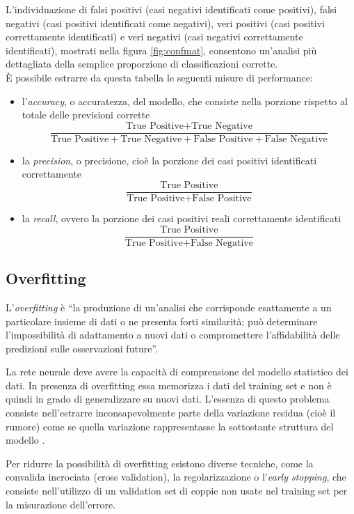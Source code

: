 L'individuazione di falsi positivi (casi negativi identificati come positivi), falsi negativi (casi positivi identificati come negativi), veri positivi (casi positivi correttamente identificati) e veri negativi (casi negativi correttamente identificati), mostrati nella figura \ref{fig:confmat}, consentono  un'analisi più dettagliata della semplice proporzione di classificazioni corrette. \\
È possibile estrarre da questa tabella le seguenti misure di performance:
\begin{itemize}
	\item l'\emph{accuracy}, o accuratezza, del modello, che consiste nella porzione rispetto al totale delle previsioni corrette
	\begin{equation}
		\frac{\mbox{True Positive} + \mbox{True Negative}}{\mbox{True Positive} + \mbox{True Negative} + \mbox{False Positive} + \mbox{False Negative}}
	\end{equation} 
	\item la \emph{precision}, o precisione, cioè la porzione dei casi positivi identificati correttamente
		\begin{equation}
	\frac{\mbox{True Positive}}{\mbox{True Positive} + \mbox{False Positive}}
	\end{equation}
	
	\item la \emph{recall}, ovvero la porzione dei casi positivi reali correttamente identificati
		\begin{equation}
	\frac{\mbox{True Positive}}{\mbox{True Positive} + \mbox{False Negative}}
	\end{equation}
\end{itemize}


\subsection{Overfitting}
\label{subsec:overfitting}

L'\emph{overfitting} è ``la produzione di un'analisi che corrisponde esattamente a un particolare insieme di dati o ne presenta forti similarità; può determinare l'impossibilità di adattamento a nuovi dati o compromettere l'affidabilità delle predizioni sulle osservazioni future''.

La rete neurale deve avere la capacità di comprensione del modello statistico dei dati. In presenza di overfitting essa memorizza i dati del training set e non è quindi in grado di generalizzare su nuovi dati. L'essenza di questo problema consiste nell'estrarre inconsapevolmente parte della variazione residua (cioè il rumore) come se quella variazione rappresentasse la sottostante struttura del modello \cite{burnham2003model}.

Per ridurre la possibilità di overfitting esistono diverse tecniche, come la convalida incrociata (cross validation), la regolarizzazione o l'\emph{early stopping}, che consiste nell'utilizzo di un validation set di coppie non usate nel training set per la misurazione dell'errore.
